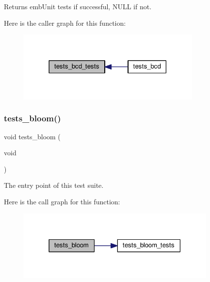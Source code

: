 \begin{DoxyReturn}{Returns}
emb\+Unit tests if successful, N\+U\+LL if not. 
\end{DoxyReturn}
Here is the caller graph for this function\+:
\nopagebreak
\begin{figure}[H]
\begin{center}
\leavevmode
\includegraphics[width=261pt]{group__unittests_ga67d8fcec140a78689e78a00ba4b2582e_icgraph}
\end{center}
\end{figure}
\mbox{\label{group__unittests_gabad6e976ec47aecf07c700f947206fdb}} 
\subsubsection{\texorpdfstring{tests\+\_\+bloom()}{tests\_bloom()}}
{\footnotesize\ttfamily void tests\+\_\+bloom (\begin{DoxyParamCaption}\item[{void}]{ }\end{DoxyParamCaption})}



The entry point of this test suite. 

Here is the call graph for this function\+:
\nopagebreak
\begin{figure}[H]
\begin{center}
\leavevmode
\includegraphics[width=283pt]{group__unittests_gabad6e976ec47aecf07c700f947206fdb_cgraph}
\end{center}
\end{figure}
\mbox{\label{group__unittests_gaaa23c5835dcd15e549fc6bf7227a928e}} 
